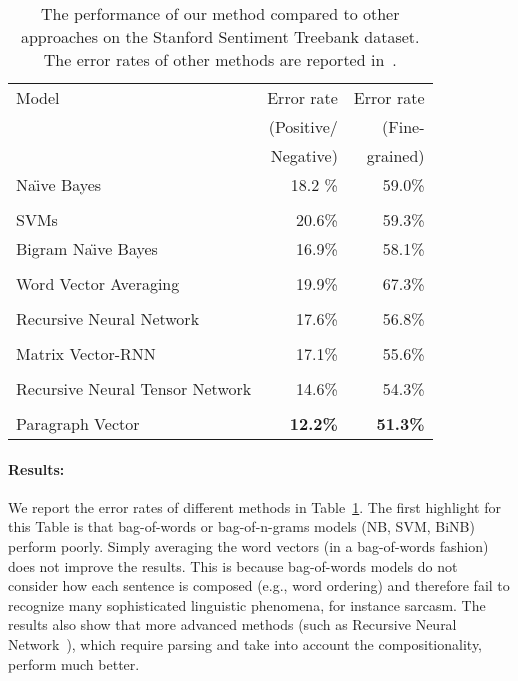 \documentclass{article}
\begin{document}
\begin{table}[htb]
\caption{The performance of our method compared to other approaches on
  the Stanford Sentiment Treebank dataset. The error rates of other
  methods are reported in~\cite{socher13}.}
\label{tab:treebank}
\begin{center}
\begin{small}
\begin{tabular}{|l|r|r|}
\hline
Model & Error rate          & Error rate\\ 
      & (Positive/ & (Fine-\\ 
      & Negative)  &  grained)             \\\hline
Na\"{\i}ve Bayes    & 18.2 \%             & 59.0\% \\ 
\cite{socher13} &                    &         \\\hline
SVMs~\cite{socher13}   & 20.6\%              & 59.3\% \\ \hline
Bigram Na\"{\i}ve Bayes  & 16.9\%               & 58.1\%\\ 
\cite{socher13}     &                      &       \\\hline
Word Vector Averaging & 19.9\%             & 67.3\%\\ 
\cite{socher13}       &                    &        \\\hline 
Recursive Neural Network  & 17.6\%               & 56.8\%\\ 
\cite{socher13}          &                      &     \\\hline
Matrix Vector-RNN & 17.1\%             & 55.6\%\\ 
\cite{socher13}   &                    &      \\\hline
Recursive Neural Tensor Network & 14.6\%               & 54.3\%\\ 
\cite{socher13}                 &                      &  \\\hline
Paragraph Vector & {\bf 12.2\%}   & {\bf 51.3\%}\\
\hline
\end {tabular}
\end{small}
\end {center}
\end {table}

\paragraph{Results:} We report the error rates of different methods in
Table~\ref{tab:treebank}. The first highlight for this Table is that
bag-of-words or bag-of-n-grams models (NB, SVM, BiNB) perform
poorly. Simply averaging the word vectors (in a bag-of-words fashion)
does not improve the results. This is because bag-of-words models do
not consider how each sentence is composed (e.g., word ordering) and
therefore fail to recognize many sophisticated linguistic phenomena,
for instance sarcasm. The results also show that more advanced methods
(such as Recursive Neural Network~\cite{socher13}), which require
parsing and take into account the compositionality, perform much
better.
\end{document}
